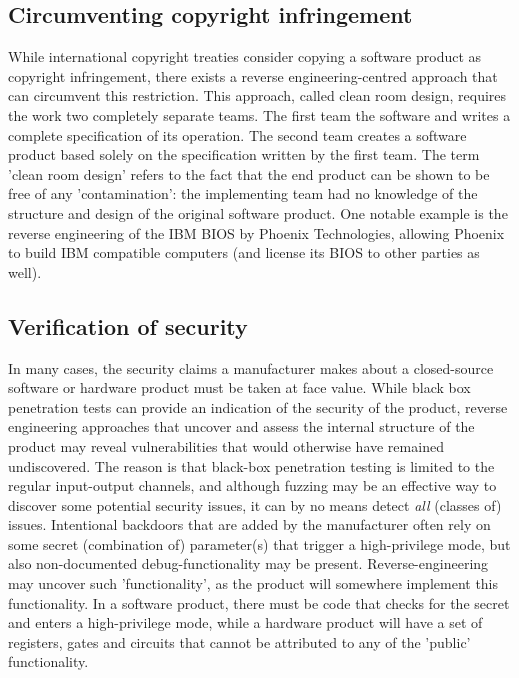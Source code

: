 \documentclass{llncs}
\begin{document}
\subsection{Circumventing copyright infringement}
While international copyright treaties consider copying a software product as copyright infringement, there exists a reverse engineering-centred approach that can circumvent this restriction. This approach, called clean room design, requires the work two completely separate teams. The first team 
 the software and writes a complete specification of its operation. The second team creates a software product based solely on the specification written by the first team. The term 'clean room design' refers to the fact that the end product can be shown to be free of any 'contamination': the implementing team had no knowledge of the structure and design of the original software product. One notable example is the reverse engineering of the IBM BIOS by Phoenix Technologies\cite{ebook:sipp}, allowing Phoenix to build IBM compatible computers (and license its BIOS to other parties as well). 

\subsection{Verification of security}
In many cases, the security claims a manufacturer makes about a closed-source software or hardware product must be taken at face value. While black box penetration tests can provide an indication of the security of the product, reverse engineering approaches that uncover and assess the internal structure of the product may reveal vulnerabilities that would otherwise have remained undiscovered. The reason is that black-box penetration testing is limited to the regular input-output channels, and although fuzzing may be an effective way to discover some potential security issues, it can by no means detect \emph{all} (classes of) issues. Intentional backdoors that are added by the manufacturer often rely on some secret (combination of) parameter(s) that trigger a high-privilege mode, but also non-documented debug-functionality may be present\cite{doc:jtag}. Reverse-engineering may uncover such 'functionality', as the product will somewhere implement this functionality. In a software product, there must be code that checks for the secret and enters a high-privilege mode, while a hardware product will have a set of registers, gates and circuits that cannot be attributed to any of the 'public' functionality.
\end{document}
